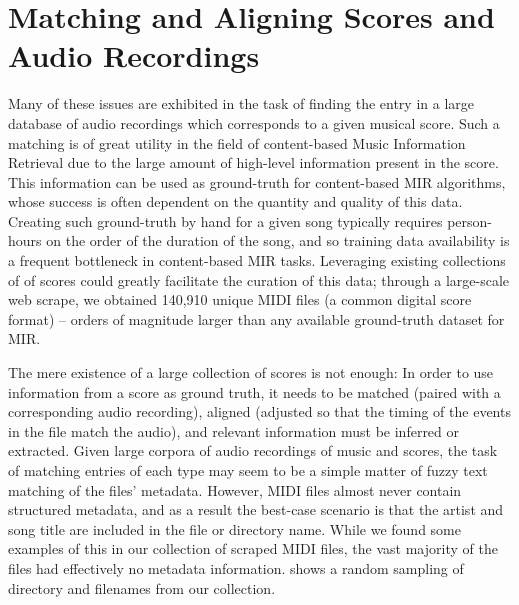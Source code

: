 \section{Matching and Aligning Scores and Audio Recordings}

Many of these issues are exhibited in the task of finding the entry in a large database of audio recordings which corresponds to a given musical score.
Such a matching is of great utility in the field of content-based Music Information Retrieval due to the large amount of high-level information present in the score.
This information can be used as ground-truth for content-based MIR algorithms, whose success is often dependent on the quantity and quality of this data.
Creating such ground-truth by hand for a given song typically requires person-hours on the order of the duration of the song, and so training data availability is a frequent bottleneck in content-based MIR tasks.
Leveraging existing collections of of scores could greatly facilitate the curation of this data; through a large-scale web scrape, we obtained 140,910 unique MIDI files (a common digital score format) -- orders of magnitude larger than any available ground-truth dataset for MIR.

The mere existence of a large collection of scores is not enough:  In order to use information from a score as ground truth, it needs to be matched (paired with a corresponding audio recording), aligned (adjusted so that the timing of the events in the file match the audio), and relevant information must be inferred or extracted.
Given large corpora of audio recordings of music and scores, the task of matching entries of each type may seem to be a simple matter of fuzzy text matching of the files' metadata.
However, MIDI files almost never contain structured metadata, and as a result the best-case scenario is that the artist and song title are included in the file or directory name.
While we found some examples of this in our collection of scraped MIDI files, the vast majority of the files had effectively no metadata information.
 shows a random sampling of directory and filenames from our collection.

